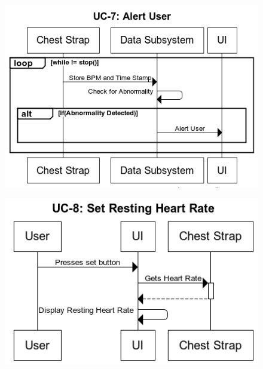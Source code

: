 \documentclass[letterpaper,english, 12pt]{scrreprt}
\begin{document}
\begin{figure}[H]
        \centering
        \includegraphics[width=\textwidth]{img/ssd/ssd_uc7.png}\\
\end{figure}

\begin{figure}[H]
        \centering
        \includegraphics[width=\textwidth]{img/ssd/ssd_uc8.png}\\
\end{figure}
\end{document}
